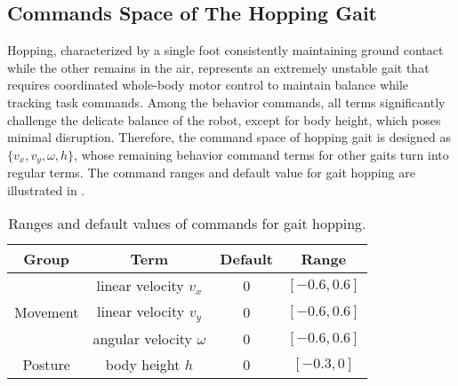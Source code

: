 \subsection{Commands Space of The Hopping Gait}
\label{ap:Hopping}
Hopping, characterized by a single foot consistently maintaining ground contact while the other remains in the air, represents an extremely unstable gait that requires coordinated whole-body motor control to maintain balance while tracking task commands. Among the behavior commands, all terms significantly challenge the delicate balance of the robot, except for body height, which poses minimal disruption. 
Therefore, the command space of hopping gait is designed as $\{v_x, v_y, \omega, h\}$, whose remaining behavior command terms for other gaits turn into regular terms.
The command ranges and default value for gait hopping are illustrated in .
\begin{table}[t]
    \centering
    \caption{\small Ranges and default values of commands for gait hopping.} 
    \begin{tabular}{@{}c|ccc@{}} \toprule
        Group                              &  Term       & Default         &  Range \\ \midrule
        \multirow{3}{*}{Movement} & linear velocity $v_x$    & 0               & $[-0.6, 0.6]$ \\
                                  & linear velocity $v_y$    & 0               & $[-0.6, 0.6]$ \\
                                  & angular velocity $\omega$ & 0               & $[-0.6, 0.6]$ \\ \midrule
        Posture & body height $h$         & 0               & $[-0.3, 0] $  \\
        \bottomrule

    \end{tabular}
    \label{tab:hopcommands}
\end{table}

